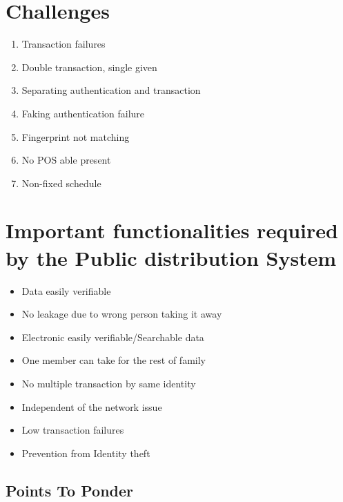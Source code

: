 \documentclass[12pt]{article}
\begin{document}
\paragraph{}


\section{Challenges}

\begin{enumerate}

    \item   Transaction failures
    \item Double transaction, single given
    \item Separating authentication and transaction
    \item Faking authentication failure
    \item Fingerprint not matching
    \item No POS able present
    \item Non-fixed schedule

\end{enumerate}

\pagebreak

\section{Important functionalities required by the Public distribution System}

\begin{itemize}
    \item   Data easily verifiable
    \item No leakage due to wrong person taking it away
    \item Electronic easily verifiable/Searchable data
    \item One member can take for the rest of family
    \item No multiple transaction by same identity
    \item Independent of the network issue
    \item Low transaction failures
    \item Prevention from Identity theft

\end{itemize}

\subsection{Points To Ponder}
\end{document}
